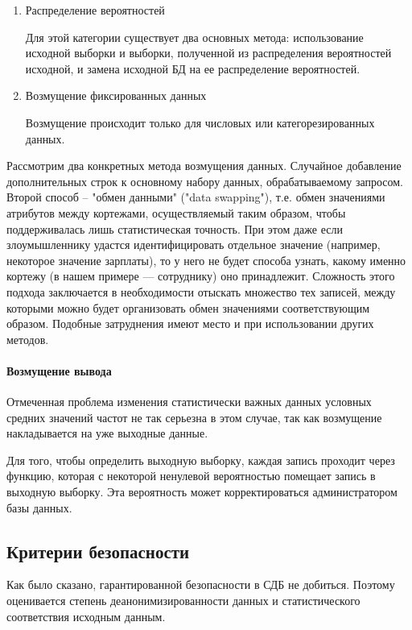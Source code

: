 \begin{enumerate}
  \item Распределение вероятностей
  
Для этой категории существует два основных метода: использование исходной выборки и выборки, полученной из распределения вероятностей исходной, и замена исходной БД на ее распределение вероятностей.

  \item Возмущение фиксированных данных
  
Возмущение происходит только для числовых или категорезированных данных.
   
\end{enumerate}


Рассмотрим два конкретных метода возмущения данных. 
Случайное добавление дополнительных строк к основному набору данных, обрабатываемому запросом.
Второй способ -- "обмен данными" ("data swapping"), т.е. обмен значениями атрибутов между кортежами, осуществляемый таким образом, чтобы поддерживалась лишь статистическая точность. При этом даже если злоумышленнику удастся идентифицировать отдельное значение (например, некоторое значение зарплаты), то у него не будет способа узнать, какому именно кортежу (в нашем примере — сотруднику) оно принадлежит. Сложность этого подхода заключается в необходимости отыскать множество тех записей, между которыми можно будет организовать обмен значениями соответствующим образом. Подобные затруднения имеют место и при использовании других методов.

\paragraph{Возмущение вывода}

Отмеченная проблема изменения статистически важных данных условных средних значений частот не так серьезна в этом случае, так как возмущение накладывается на уже выходные данные.

Для того, чтобы определить выходную выборку, каждая запись проходит через функцию, которая с некоторой ненулевой вероятностью помещает запись в выходную выборку. Эта вероятность может корректироваться администратором базы данных. 

  \subsection{Критерии безопасности}

Как было сказано, гарантированной безопасности в СДБ не добиться. Поэтому оценивается степень деанонимизированности данных и статистического соответствия исходным данным.

